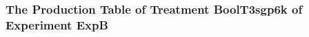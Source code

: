  \begin{frame}
 \fontsize{8pt}{9pt}\selectfont
 \frametitle{ The Production Table of Treatment BoolT3sgp6k of Experiment ExpB }

 \label{ExpBGrammarTable025.tex}  
 \end{frame}

